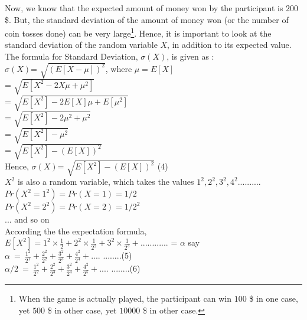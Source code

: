 \documentclass[11pt,fleqn]{book} %
\begin{document}
Now, we know that the expected amount of money won by the participant is $200$ \$. But, the standard deviation of the amount of money won (or the number of coin tosses done) can be very large\footnote{When the game is actually played, the participant can win $100$ \$ in one case, yet $500$ \$ in other case, yet $10000$ \$ in other case.}. Hence, it is important to look at the standard deviation of the random variable $X$, in addition to its expected value.\\

The formula for Standard Deviation, $\sigma(X)$, is given as :\\ 

$\sigma(X)$= $ \sqrt{(E[X- \mu])^2} $, where $\mu = E[X]$\\


= $ \sqrt{E[X^2 - 2 X \mu + \mu ^ 2]} $\\

= $ \sqrt{E[X^2 ]- 2 E[X] \mu + E[\mu ^ 2]} $\\

= $ \sqrt{E[X^2 ]- 2 \mu^2 + \mu ^ 2} $\\

= $ \sqrt{E[X^2 ]- \mu ^ 2} $\\

= $ \sqrt{E[X^2 ]- (E[X]) ^ 2} $\\

Hence, $\sigma(X)$=  $ \sqrt{E[X^2 ]- (E[X]) ^ 2} $	(4)\\

$X^2$ is also a random variable, which takes the values $1^2, 2^2, 3^2, 4^2..........$\\

$Pr(X^2=1^2) = Pr(X=1) = 1/2$\\

$Pr(X^2=2^2) = Pr(X=2) = 1/2^2$\\

... and so on \\

According the the expectation formula, $E[X^2] = 1^2 \times \frac{1}{2} + 2^2 \times \frac{1}{2^2} + 3^2 \times \frac{1}{2^3} + ............  $ = $\alpha$ say\\

$\alpha\ =\ \frac{1^2}{2^1} + \frac{2^2}{2^2} + \frac{3^2}{2^3} + \frac{4^2}{2^4} + .... $   \hspace{5mm} ........(5) \\	


$\alpha/2\ =\ \frac{1^2}{2^2} + \frac{2^2}{2^3} + \frac{3^2}{2^4} + \frac{4^2}{2^5} + .... $   \hspace{5mm} ........(6)  \\
\end{document}
